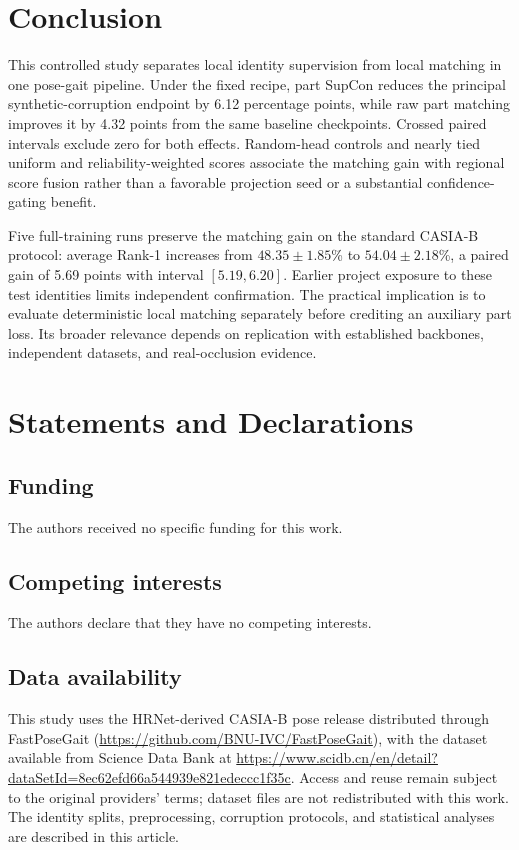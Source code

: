 \documentclass[pdflatex,iicol,sn-apa]{sn-jnl}
\begin{document}
\section{Conclusion}

This controlled study separates local identity supervision from local matching
in one pose-gait pipeline. Under the fixed recipe, part SupCon reduces the
principal synthetic-corruption endpoint by 6.12 percentage points, while raw
part matching improves it by 4.32 points from the same baseline checkpoints.
Crossed paired intervals exclude zero for both effects. Random-head controls
and nearly tied uniform and reliability-weighted scores associate the matching
gain with regional score fusion rather than a favorable projection seed or a
substantial confidence-gating benefit.

Five full-training runs preserve the matching gain on the standard CASIA-B
protocol: average Rank-1 increases from $48.35\pm1.85$\% to
$54.04\pm2.18$\%, a paired gain of 5.69 points with interval $[5.19,6.20]$.
Earlier project exposure to these test identities limits independent
confirmation. The practical implication is to evaluate deterministic local
matching separately before crediting an auxiliary part loss. Its broader
relevance depends on replication with established backbones, independent
datasets, and real-occlusion evidence.

\backmatter

\section*{Statements and Declarations}

\subsection*{Funding}
The authors received no specific funding for this work.

\subsection*{Competing interests}
The authors declare that they have no competing interests.

\subsection*{Data availability}
This study uses the HRNet-derived CASIA-B pose release distributed through
FastPoseGait (\url{https://github.com/BNU-IVC/FastPoseGait}), with the dataset
available from Science Data Bank at
\url{https://www.scidb.cn/en/detail?dataSetId=8ec62efd66a544939e821edeccc1f35c}.
Access and reuse remain subject to the original providers' terms; dataset files
are not redistributed with this work. The identity splits, preprocessing,
corruption protocols, and statistical analyses are described in this article.
\end{document}
